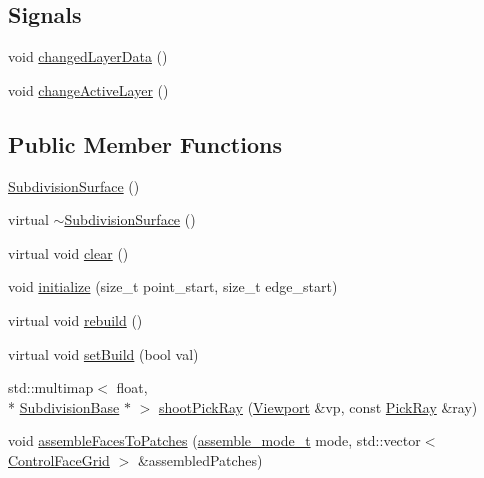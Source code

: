 \subsection*{Signals}
\begin{DoxyCompactItemize}
\item 
void \hyperlink{classShipCAD_1_1SubdivisionSurface_a5598e484d5deddfa353ddc4f02d3b004}{changed\-Layer\-Data} ()
\item 
void \hyperlink{classShipCAD_1_1SubdivisionSurface_aad7f3abd89252d503b7d21ca306436d4}{change\-Active\-Layer} ()
\end{DoxyCompactItemize}
\subsection*{Public Member Functions}
\begin{DoxyCompactItemize}
\item 
\hyperlink{classShipCAD_1_1SubdivisionSurface_a507ea9cd5354e1d14fe24d52da505934}{Subdivision\-Surface} ()
\item 
virtual \hyperlink{classShipCAD_1_1SubdivisionSurface_a4f1b66a4d9e9f8ac3dbd956e2113a594}{$\sim$\-Subdivision\-Surface} ()
\item 
virtual void \hyperlink{classShipCAD_1_1SubdivisionSurface_a80ab3bd6372a8465d69f71034a353e06}{clear} ()
\item 
void \hyperlink{classShipCAD_1_1SubdivisionSurface_a13cfd2714344c9b85aad8d123538db48}{initialize} (size\-\_\-t point\-\_\-start, size\-\_\-t edge\-\_\-start)
\item 
virtual void \hyperlink{classShipCAD_1_1SubdivisionSurface_a259856fc21f2bc1eebbc52f10dd59469}{rebuild} ()
\item 
virtual void \hyperlink{classShipCAD_1_1SubdivisionSurface_aec5073750762d1f8c3ab2107a742f4a5}{set\-Build} (bool val)
\item 
std\-::multimap$<$ float, \\*
\hyperlink{classShipCAD_1_1SubdivisionBase}{Subdivision\-Base} $\ast$ $>$ \hyperlink{classShipCAD_1_1SubdivisionSurface_ae04c14926cffce82e2ca6f0566484684}{shoot\-Pick\-Ray} (\hyperlink{classShipCAD_1_1Viewport}{Viewport} \&vp, const \hyperlink{structShipCAD_1_1PickRay}{Pick\-Ray} \&ray)
\item 
void \hyperlink{classShipCAD_1_1SubdivisionSurface_ab14892e66e800a795e1af3dcc781af02}{assemble\-Faces\-To\-Patches} (\hyperlink{namespaceShipCAD_aaba70dc1c80dc540bef320cb9b720a20}{assemble\-\_\-mode\-\_\-t} mode, std\-::vector$<$ \hyperlink{structShipCAD_1_1ControlFaceGrid}{Control\-Face\-Grid} $>$ \&assembled\-Patches)

\end{DoxyCompactItemize}
